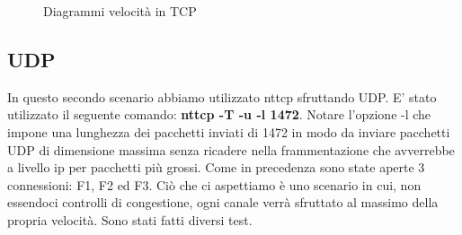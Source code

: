 \documentclass[12pt]{article}
\begin{document}
\begin{figure}[H]
	\noindent{}
	\caption{Diagrammi velocità in TCP}
\end{figure}

\subsection{UDP}
In questo secondo scenario abbiamo utilizzato nttcp sfruttando UDP.
E' stato utilizzato il seguente comando: \textbf{nttcp -T -u -l 1472}.
Notare l'opzione -l che impone una lunghezza dei pacchetti inviati di 1472 in modo da inviare pacchetti UDP di dimensione massima senza ricadere nella frammentazione che avverrebbe a livello ip per pacchetti più grossi.
Come in precedenza sono state aperte 3 connessioni: F1, F2 ed F3.
Ciò che ci aspettiamo è uno scenario in cui, non essendoci controlli di congestione, ogni canale verrà sfruttato al massimo della propria velocità.
Sono stati fatti diversi test.
\end{document}
